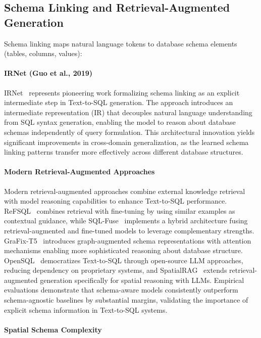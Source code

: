 \subsection{Schema Linking and Retrieval-Augmented Generation}

Schema linking maps natural language tokens to database schema elements (tables, columns, values):

\paragraph{IRNet (Guo et al., 2019)}

IRNet~\cite{irnet} represents pioneering work formalizing schema linking as an explicit intermediate step in Text-to-SQL generation. The approach introduces an intermediate representation (IR) that decouples natural language understanding from SQL syntax generation, enabling the model to reason about database schemas independently of query formulation. This architectural innovation yields significant improvements in cross-domain generalization, as the learned schema linking patterns transfer more effectively across different database structures.

\paragraph{Modern Retrieval-Augmented Approaches}

Modern retrieval-augmented approaches combine external knowledge retrieval with model reasoning capabilities to enhance Text-to-SQL performance. ReFSQL~\cite{refsql} combines retrieval with fine-tuning by using similar examples as contextual guidance, while SQL-Fuse~\cite{sqlfuse} implements a hybrid architecture fusing retrieval-augmented and fine-tuned models to leverage complementary strengths. GraFix-T5~\cite{grafix_t5} introduces graph-augmented schema representations with attention mechanisms enabling more sophisticated reasoning about database structure. OpenSQL~\cite{opensql} democratizes Text-to-SQL through open-source LLM approaches, reducing dependency on proprietary systems, and SpatialRAG~\cite{spatial_rag} extends retrieval-augmented generation specifically for spatial reasoning with LLMs. Empirical evaluations demonstrate that schema-aware models consistently outperform schema-agnostic baselines by substantial margins, validating the importance of explicit schema information in Text-to-SQL systems.

\paragraph{Spatial Schema Complexity}


